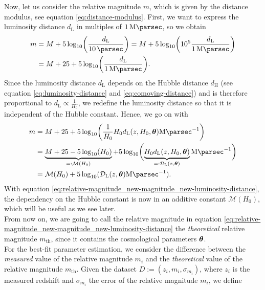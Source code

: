 Now, let us consider the relative magnitude $m$, which is given by the distance modulus, see equation \eqref{eq:distance-modulus}. First, we want to express the luminosity distance $d_{\text{L}}$ in multiples of $\SI{1}{\mega \parsec}$, so we obtain
\begin{align*}
    m &= M + 5\log_{10}\biggl( \frac{d_{\text{L}}}{\SI{10}{\parsec}} \biggr) = M + 5\log_{10}\biggl( 10^{5} \frac{d_{\text{L}}}{\SI{1}{\mega \parsec}} \biggr) \\
      &= M + 25 + 5\log_{10}\biggl(\frac{d_{\text{L}}}{\SI{1}{\mega \parsec}}\biggr). 
\end{align*}
Since the luminosity distance $d_{\text{L}}$ depends on the Hubble distance $d_{\text{H}}$ (see equation \eqref{eq:luminosity-distance} and \eqref{eq:comoving-distance}) and is therefore proportional to $d_{\text{L}} \propto \frac{1}{H_{0}}$, we redefine the luminosity distance so that it is independent of the Hubble constant. Hence, we go on with 
\begin{align}
m &= M + 25 + 5\log_{10} \biggl(\frac{1}{H_{0}} H_{0} d_{\text{L}}(z, H_{0}, \vb*{\theta}) \SI{}{\mega \parsec^{-1}} \biggr) \nonumber \\
  &= \underbrace{M + 25 - 5\log_{10}(H_{0})}_{ =: \mathcal{M}(H_{0}) } + 5 \log_{10} \biggl( \underbrace{H_{0} d_{\text{L}}(z, H_{0}, \vb*{\theta})}_{ =: \mathcal{D}_{\text{L}}(z, \vb*{\theta}) } \SI{}{\mega \parsec^{-1}} \biggr) \nonumber \\
  &= \mathcal{M}(H_{0}) + 5 \log_{10}(\mathcal{D}_{\text{L}}(z, \vb*{\theta}) \SI{}{\mega \parsec^{-1}}). \label{eq:relative-magnitude_new-magnitude_new-luminosity-distance}
\end{align}
With equation \eqref{eq:relative-magnitude_new-magnitude_new-luminosity-distance}, the dependency on the Hubble constant is now in an additive constant $\mathcal{M}(H_{0})$, which will be useful as we see later. \\

\noindent From now on, we are going to call the relative magnitude in equation \eqref{eq:relative-magnitude_new-magnitude_new-luminosity-distance} the \textit{theoretical} relative magnitude $m_{\text{th}}$, since it contains the cosmological parameters $\vb*{\theta}$. \\ 

\noindent For the best-fit parameter estimation, we consider the difference between the \textit{measured} value of the relative magnitude $m_{i}$ and the \textit{theoretical} value of the relative magnitude $m_{\text{th}}$. Given the dataset $D := (z_{i}, m_{i}, \sigma_{m_{i}})$, where $z_{i}$ is the measured redshift and $\sigma_{m_{i}}$ the error of the relative magnitude $m_{i}$, we define 

